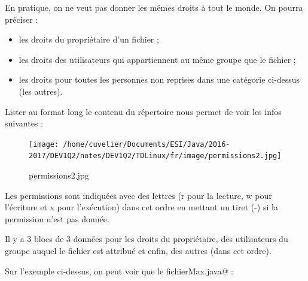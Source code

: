 \documentclass[11pt,a4paper]{article}
\begin{document}
            \par
        
				  En pratique, on ne veut pas donner les m\^emes droits \`a tout le monde. On pourra pr\'eciser :
				  
					\begin{itemize}
				
			\item les droits du propri\'etaire d'un fichier ;
			\item les droits des utilisateurs qui appartiennent au m\^eme groupe que le fichier ;
			\item les droits pour toutes les personnes non reprises dans une cat\'egorie ci-dessus (les autres).
					\end{itemize}
				
            \par
        
				  Lister au format long le contenu du r\'epertoire nous permet de voir les infos suivantes :
				
            \par
        \begin{figure}[hbt]
				    \begin{center}
					\texttt{[image: /home/cuvelier/Documents/ESI/Java/2016-2017/DEV1Q2/notes/DEV1Q2/TDLinux/fr/image/permissions2.jpg]}
						\end{center}
                
                    \caption[permissions2.jpg]{permissions2.jpg}
                \end{figure}
                    
            \par
        
          Les permissions sont indiqu\'ees avec des lettres (r pour la lecture, w pour l'\'ecriture et x pour l'ex\'ecution) 
          dans cet ordre en mettant un tiret (-) si la permission n'est pas donn\'ee. 
        
            \par
        
          Il y a 3 blocs de 3 donn\'ees pour les droits du propri\'etaire, des utilisateurs du groupe auquel le fichier est attribu\'e et enfin, des autres (dans cet ordre).
        
            \par
        
          Sur l'exemple ci-dessus, on peut voir que le fichier\verb@ Max.java@ :
          
\end{document}
